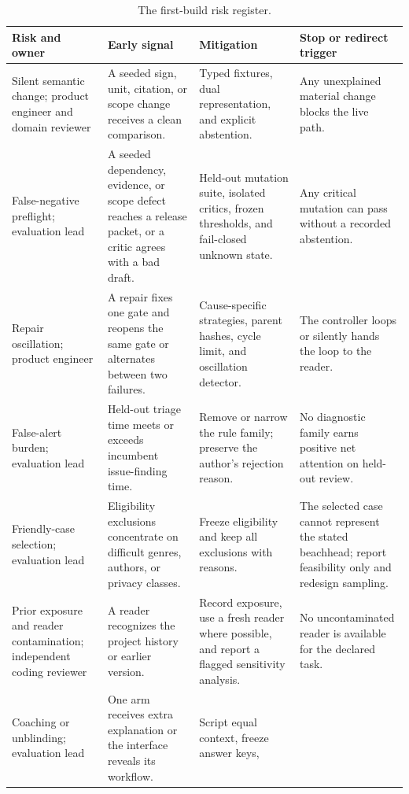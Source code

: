 \begin{longtable}{@{}>{\raggedright\arraybackslash}p{}
>{\raggedright\arraybackslash}p{}
>{\raggedright\arraybackslash}p{}
>{\raggedright\arraybackslash}p{}@{}}
\caption{The first-build risk register.}
\label{tab:first-build-risks}\\
\toprule
Risk and owner & Early signal & Mitigation & Stop or redirect trigger \\
\midrule
Silent semantic change; product engineer and domain reviewer & A seeded sign,
unit, citation, or scope change receives a clean comparison. & Typed fixtures,
dual representation, and explicit abstention. & Any unexplained material
change blocks the live path. \\
False-negative preflight; evaluation lead & A seeded dependency, evidence, or
scope defect reaches a release packet, or a critic agrees with a bad draft. &
Held-out mutation suite, isolated critics, frozen thresholds, and fail-closed
unknown state. & Any critical mutation can pass without a recorded abstention. \\
Repair oscillation; product engineer & A repair fixes one gate and reopens the
same gate or alternates between two failures. & Cause-specific strategies,
parent hashes, cycle limit, and oscillation detector. & The controller loops or
silently hands the loop to the reader. \\
False-alert burden; evaluation lead & Held-out triage time meets or exceeds
incumbent issue-finding time. & Remove or narrow the rule family; preserve the
author's rejection reason. & No diagnostic family earns positive net attention
on held-out review. \\
Friendly-case selection; evaluation lead & Eligibility exclusions concentrate
on difficult genres, authors, or privacy classes. & Freeze eligibility and keep
all exclusions with reasons. & The selected case cannot represent the stated
beachhead; report feasibility only and redesign sampling. \\
Prior exposure and reader contamination; independent coding reviewer & A
reader recognizes the project history or earlier version. & Record exposure,
use a fresh reader where possible, and report a flagged sensitivity analysis. &
No uncontaminated reader is available for the declared task. \\
Coaching or unblinding; evaluation lead & One arm receives extra explanation or
the interface reveals its workflow. & Script equal context, freeze answer keys,

\end{longtable}
